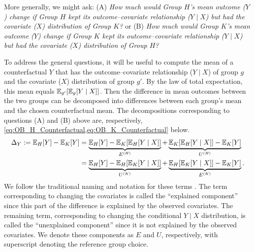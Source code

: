 
More generally, we might ask:
(A) \emph{How much would Group $H$'s mean outcome ($Y$) change if Group $H$ kept its outcome--covariate relationship ($Y \mid X$) but had the covariate ($X$) distribution of Group $K$?}
or 
(B) \emph{How much would Group $K$'s mean outcome ($Y$) change if Group $K$ kept its outcome--covariate relationship ($Y \mid X$) but had the covariate ($X$) distribution of Group $H$?}

To address the general questions, it will be useful to compute the mean of a counterfactual $Y$ that has the outcome--covariate relationship ($Y \mid X$) of group $g$ and the covariate ($X$) distribution of group $g'$. By the law of total expectation, this mean equals
$\mathbb{E}_{g'}[\mathbb{E}_g[Y \mid X]]$.
Then the difference in mean outcomes between the two groups can be decomposed into differences between each group's mean
and the chosen counterfactual mean. The decompositions corresponding to questions (A) and (B) above are, respectively, 
\cref{eq:OB_H_Counterfactual,eq:OB_K_Counterfactual} below.
%
\begin{align}
\Delta_Y := \mathbb{E}_H[Y] - \mathbb{E}_K[Y] 
    \label{eq:OB_H_Counterfactual}
    &=\underbrace{\mathbb{E}_H[Y] - \mathbb{E}_K[\mathbb{E}_H[Y \mid X]] }_{E^{(H)}} 
     + \underbrace{\mathbb{E}_K[\mathbb{E}_H[Y \mid X]] - \mathbb{E}_K[Y]}_{U^{(H)} } \\
     \label{eq:OB_K_Counterfactual}
     &=\underbrace{\mathbb{E}_H[Y] - \mathbb{E}_H[\mathbb{E}_K[Y \mid X]] }_{U^{(K)}} 
     + \underbrace{\mathbb{E}_H[\mathbb{E}_K[Y \mid X]] - \mathbb{E}_K[Y] }_{E^{(K)}}.
\end{align} 
%
We follow the traditional naming and notation for these terms \citep{fortinLemieuxFirpo2011}.
The term corresponding to changing the covariates is called the
``explained component'' since this part of the difference is explained by the observed
covariates. The remaining term, corresponding to changing the conditional $Y \mid X$ distribution,
is called the ``unexplained component'' since it is not explained by the observed covariates. We denote these components as $E$ and $U$, respectively, with superscript denoting the reference group choice.

